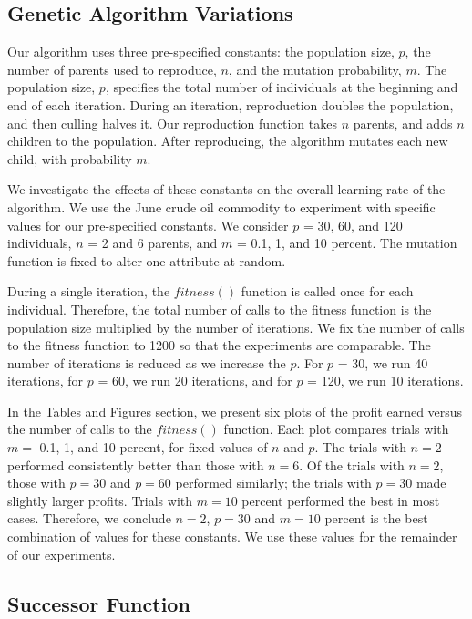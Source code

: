 \documentclass[12pt]{article}
\begin{document}
\subsection{Genetic Algorithm Variations}

Our algorithm uses three pre-specified constants: the population size, $p$, the
number of parents used to reproduce, $n$, and the mutation probability, $m$. The
population size, $p$, specifies the total number of individuals at the beginning
and end of each iteration. During an iteration, reproduction doubles the
population, and then culling halves it. Our reproduction function takes $n$
parents, and adds $n$ children to the population. After reproducing, the
algorithm mutates each new child, with probability $m$.

We investigate the effects of these constants on the overall learning rate of
the algorithm. We use the June crude oil commodity to experiment with specific
values for our pre-specified constants. We consider $p$ = 30, 60, and 120
individuals, $n$ = 2 and 6 parents, and $m$ = 0.1, 1, and 10 percent.  The
mutation function is fixed to alter one attribute at random.

During a single iteration, the $fitness()$ function is called once for each
individual.  Therefore, the total number of calls to the fitness function is the
population size multiplied by the number of iterations.  We fix the number of
calls to the fitness function to 1200 so that the experiments are
comparable. The number of iterations is reduced as we increase the $p$. For $p$
= 30, we run 40 iterations, for $p$ = 60, we run 20 iterations, and for $p$ =
120, we run 10 iterations.

In the Tables and Figures section, we present six plots of the profit earned
versus the number of calls to the $fitness()$ function.  Each plot compares
trials with $m = $ 0.1, 1, and 10 percent, for fixed values of $n$ and $p$.  The
trials with $n = 2$ performed consistently better than those with $n = 6$.  Of
the trials with $n = 2$, those with $p = 30$ and $p = 60$ performed similarly;
the trials with $p = 30$ made slightly larger profits.  Trials with $m = 10$
percent performed the best in most cases.  Therefore, we conclude $n = 2$, $p =
30$ and $m = 10$ percent is the best combination of values for these constants.
We use these values for the remainder of our experiments.

\subsection{Successor Function}
\end{document}
